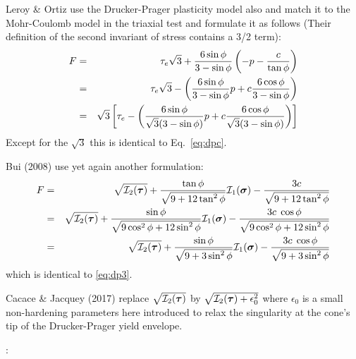 \vspace{1.3cm}
\begin{remark}
Leroy \& Ortiz \cite{leor89} use the Drucker-Prager plasticity model also and match it to the Mohr-Coulomb model in the 
triaxial test and formulate it as follows 
(Their definition of the second invariant of stress contains a 3/2 term):
\begin{eqnarray}
F 
&=& \tau_e \sqrt{3} + \frac{6 \sin\phi}{3-\sin\phi} \left( -p  - \frac{c}{\tan \phi} \right) \nonumber\\
&=& \tau_e \sqrt{3} - \left( \frac{6 \sin\phi}{3-\sin\phi}  p  + c \frac{6 \cos\phi}{3-\sin\phi} \right) \nonumber\\
&=& \sqrt{3} \left[ \tau_e  - \left( \frac{6 \sin\phi}{\sqrt{3}(3-\sin\phi)}  p  + c \frac{6 \cos\phi}{\sqrt{3}(3-\sin\phi)} \right)  \right]
\end{eqnarray}
Except for the $\sqrt{3}$ this is identical to Eq.~\eqref{eq:dpc}.
\end{remark}

\begin{remark}
Bui \etal (2008) \cite{bufs08} use yet again another formulation:
\begin{eqnarray}
F 
&=& \sqrt{{\cal I}_2({\bm \tau})} + \frac{\tan \phi}{\sqrt{9 + 12 \tan^2 \phi}} {\cal I}_1({\bm \sigma})
- \frac{3 c}{\sqrt{9 + 12 \tan^2 \phi}} \nonumber\\
&=& \sqrt{{\cal I}_2({\bm \tau})} + \frac{\sin \phi}{\sqrt{9\cos^2 \phi + 12 \sin^2 \phi}} {\cal I}_1({\bm \sigma}) - \frac{3 c \; \cos\phi}{\sqrt{9\cos^2\phi + 12 \sin^2 \phi}} \nonumber\\
&=& \sqrt{{\cal I}_2({\bm \tau})} + \frac{\sin \phi}{\sqrt{9 + 3 \sin^2 \phi}} {\cal I}_1({\bm \sigma}) - \frac{3 c \; \cos\phi}{\sqrt{9 + 3\sin^2 \phi}} \nonumber
\end{eqnarray}
which is identical to \eqref{eq:dp3}.
\end{remark}

\begin{remark}
Cacace \& Jacquey (2017) \cite{caja17} replace $\sqrt{{\cal I}_2({\bm \tau})}$ by 
$\sqrt{{\cal I}_2({\bm \tau})+\epsilon_0^2}$ where $\epsilon_0$ is a small non-hardening parameters 
here introduced to relax the singularity at the cone's tip of the Drucker-Prager yield envelope.
\end{remark}

\Literature:

\newpage
